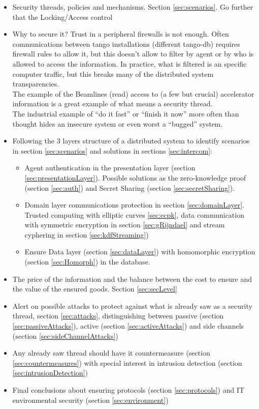 \documentclass[10pt,a4paper,twoside]{llncs}
\begin{document}
\begin{itemize}
 \item Security threads, policies and mechanisms. Section \ref{sec:scenarios}. Go further that the Locking/Access control
 \item Why to secure it? Trust in a peripheral firewalls is not enough. Often communications between tango installations (different tango-db) requires firewall rules to allow it, but this doesn't allow to filter by agent or by who is allowed to access the information. In practice, what is filtered is an specific computer traffic, but this breaks many of the distributed system transparencies.\\ The example of the Beamlines (read) access to (a few but crucial) accelerator information is a great example of what means a security thread.\\The industrial example of ``do it fast'' or ``finish it now'' more often than thought hides an insecure system or even worst a ``bugged'' system. 
  \\
 \item Following the 3 layers structure of a distributed system \cite{TanenbaumDistr} to identify scenarios in section \ref{sec:scenarios} and solutions in sections \ref{sec:intercom}:
 \begin{itemize}
 \item Agent authentication in the presentation layer (section \ref{sec:presentationLayer}). Possible solutions as the zero-knowledge proof (section \ref{sec:auth}) and Secret Sharing (section \ref{sec:secretSharing}).
 \item Domain layer communications protection in section \ref{sec:domainLayer}. Trusted computing with elliptic curves \ref{sec:ecpk}, data communication with symmetric encryption in section \ref{sec:gRijndael} and stream cyphering in section \ref{sec:kdfStreaming})
 \item Ensure Data layer (section \ref{sec:dataLayer}) with homomorphic encryption (section \ref{sec:Homorph}) in the database.
 \end{itemize}
 \item The price of the information and the balance between the cost to ensure and the value of the ensured goods. Section \ref{sec:secLevel}
 \item Alert on possible attacks to protect against what is already saw as a security thread, section \ref{sec:attacks}, distinguishing between passive (section \ref{sec:passiveAttacks}), active (section \ref{sec:activeAttacks}) and side channels (section \ref{sec:sideChannelAttacks})
 \item Any already saw thread should have it countermeasure (section \ref{sec:countermeasures}) with special interest in intrusion detection (section \ref{sec:intrusionDetection})
 \item Final conclusions about ensuring protocols (section \ref{sec:protocols}) and IT environmental security (section \ref{sec:environment})
\end{itemize}
\end{document}
